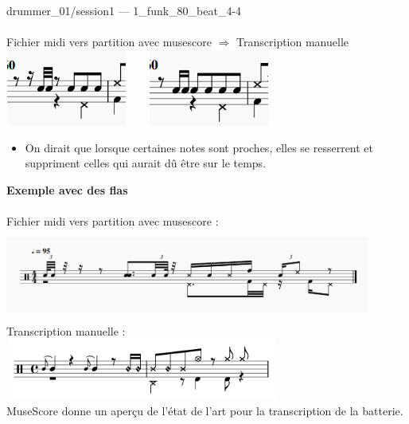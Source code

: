 drummer\_01/session1 — 1\_funk\_80\_beat\_4-4\\\\
Fichier midi vers partition avec musescore $\Rightarrow$ Transcription manuelle\\
\includegraphics[height=25mm, width=40mm]{z_images/transcriptions_manuelles/0_prise_en_main/1_drummer_01__session1/musescore_0.png}\ \ \ \ 
\includegraphics[height=25mm, width=40mm]{z_images/transcriptions_manuelles/0_prise_en_main/1_drummer_01__session1/Manuelle_0.png}
\begin{itemize}
	\item On dirait que lorsque certaines notes sont proches, elles se resserrent et suppriment celles qui aurait dû être sur le temps.\\
\end{itemize}
\textbf{Exemple avec des flas}\\\\
Fichier midi vers partition avec musescore :\\
\includegraphics[height=30mm, width=120mm]{z_images/transcriptions_manuelles/1_transcriptions_flas/124_funk_95_fill_4-4_0.png}\\
Transcription manuelle :\\
\includegraphics[height=20mm, width=90mm]{z_images/transcriptions_manuelles/1_transcriptions_flas/124_funk_95_fill_4-4_1_.png}\\
MuseScore donne un aperçu de l’état de l’art pour la transcription de la batterie.
\newpage
